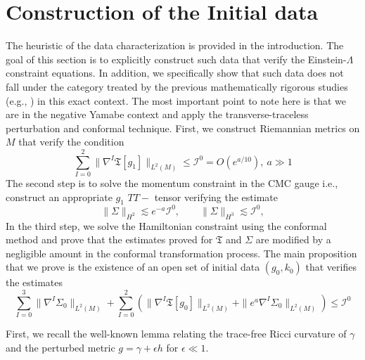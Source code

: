 \documentclass{amsart}
\begin{document}
\section{Construction of the Initial data}
\label{data}
\noindent The heuristic of the data characterization is provided in the introduction. The goal of this section is to explicitly construct such data that verify the Einstein-$\Lambda$ constraint equations. In addition, we specifically show that such data does not fall under the category treated by the previous mathematically rigorous studies (e.g., \cite{fajman2020stable}) in this exact context. The most important point to note here is that we are in the negative Yamabe context and apply the transverse-traceless perturbation and conformal technique. First, we construct Riemannian metrics on $M$ that verify the condition 
\[
\sum_{I = 0}^{2}  \| \nabla^I \mathfrak{T}[g_1] \|_{L^2(M)}  \leq \mathcal{I}^0=O(e^{a/10}),~a\gg 1
\]
The second step is to solve the momentum constraint in the CMC gauge i.e., construct an appropriate $g_{1}$ $TT-$ tensor verifying the estimate 
\[
\|\Sigma\|_{H^{2}}\lesssim e^{-a}\mathcal I^{0},
\qquad
\|\Sigma\|_{H^{3}}\lesssim \mathcal I^{0},
\]
In the third step, we solve the Hamiltonian constraint using the conformal method and prove that the estimates proved for $\mathfrak{T}$ and $\Sigma$ are modified by a negligible amount in the conformal transformation process. The main proposition that we prove is the existence of an open set of initial data $(g_{0},k_{0})$ that verifies the estimates 
\[
\sum_{I = 0}^{3} \| \nabla^I \Sigma_0 \|_{L^2(M)} + \sum_{I = 0}^{2} \left( \| \nabla^I \mathfrak{T}[g_0] \|_{L^2(M)} + \| e^a \nabla^I \Sigma_0 \|_{L^2(M)} \right) \leq \mathcal{I}^0
\]

\noindent First, we recall the well-known lemma relating the trace-free Ricci curvature of $\gamma$ and the perturbed metric $g=\gamma+\epsilon h$ for $\epsilon\ll1$.
\end{document}
